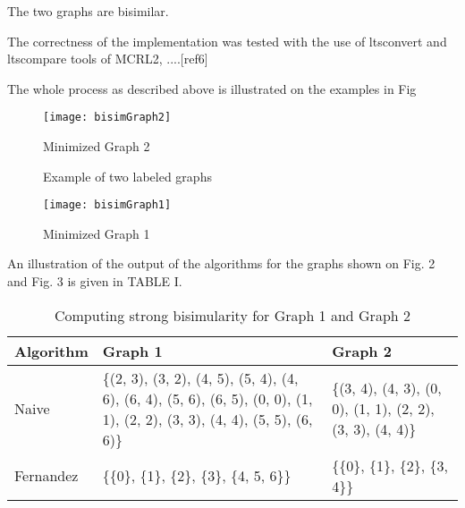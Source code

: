 %
%

The two graphs are bisimilar.

The correctness of the implementation was tested with the use of ltsconvert and ltscompare tools of MCRL2, ....[ref6]

The whole process as described above is illustrated on the examples in Fig 

\begin{figure}[h!]
\centering
\texttt{[image: bisimGraph2]}
\caption{Minimized Graph 2}
\label{fig:bisimGraph2}
\end{figure}

\begin{figure}[h!]
\centering
{}
\label{fig:exampleGraphs}
\caption{Example of two labeled graphs}
\end{figure}

\begin{figure}[h!]
\centering
\texttt{[image: bisimGraph1]}
\caption{Minimized Graph 1}
\label{fig:bisimGraph1}
\end{figure}

An illustration of the output of the algorithms for the graphs shown on Fig. 2 and Fig. 3 is given in TABLE I.

\begin{table}[h!]
\begin{tabular}{| l | p{3.2cm}| p{3.2cm} | }
  \hline                       
  Algorithm & Graph 1 & Graph 2 \\ \hline
  Naive & \{(2, 3), (3, 2), (4, 5), 
(5, 4), (4, 6), (6, 4), (5, 6), (6, 5), (0, 0), (1, 1), (2, 2), (3, 3), (4, 4), (5, 5), (6, 6)\} & \{(3, 4), (4, 3), (0, 0), 
(1, 1), (2, 2), (3, 3), (4, 4)\} \\ \hline
  Fernandez & \{\{0\}, \{1\}, \{2\}, \{3\}, \{4, 5, 6\}\} & \{\{0\}, \{1\}, \{2\}, \{3, 4\}\} \\ \hline  
\end{tabular}
\caption{Computing strong bisimularity for Graph 1 and Graph 2}
\label{table1}
\end{table}


